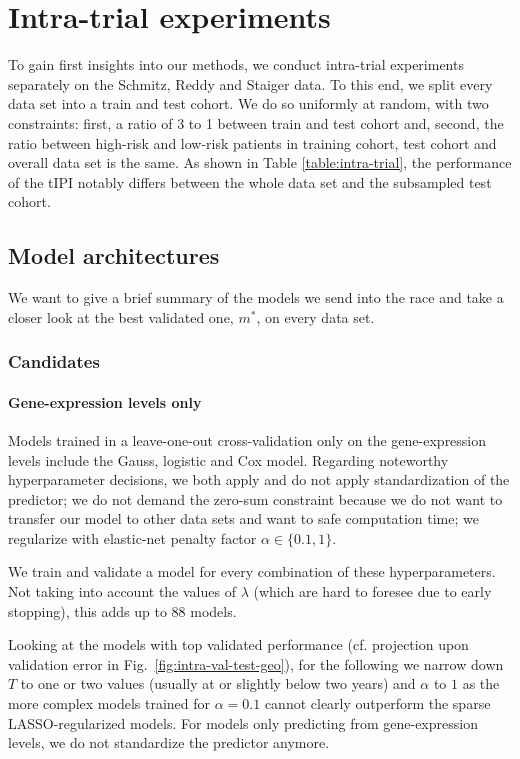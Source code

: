 \section{Intra-trial experiments}\label{sec:intra-trial}

To gain first insights into our methods, we conduct intra-trial experiments separately on the 
Schmitz, Reddy and Staiger data. To this end, we split every data set into a train and test 
cohort. We do so uniformly at random, with two constraints: first, a ratio of 3 to 1 between train 
and test cohort and, second, the ratio between high-risk and low-risk patients in training cohort, 
test cohort and overall data set is the same. As shown in Table \ref{table:intra-trial}, the 
performance of the tIPI notably differs between the whole data set and the subsampled test cohort. 



\subsection{Model architectures}

We want to give a brief summary of the models we send into the race and take a closer look at the 
best validated one, $m^*$, on every data set.

\subsubsection{Candidates}

\paragraph{Gene-expression levels only}
Models trained in a leave-one-out cross-validation only on the gene-expression levels include the 
Gauss, logistic and Cox model. Regarding noteworthy hyperparameter decisions, we both apply and 
do not apply standardization of the predictor; we do not demand the zero-sum constraint 
because we do not want to transfer our model to other data sets and want to safe computation time;
we regularize with elastic-net penalty factor $\alpha \in \{ \num{0.1}, 1 \}$.

We train and validate a model for every combination of these hyperparameters.
Not taking into account the values of $\lambda$ (which are hard to foresee due to early stopping), 
this adds up to \num{88} models.

Looking at the models with top validated performance (cf. projection upon validation error in Fig.\
\ref{fig:intra-val-test-geo}), for the following we narrow down $T$ to one or 
two values (usually at or slightly below two years) and $\alpha$ to $1$ as the more complex models 
trained for $\alpha = \num{0.1}$ cannot clearly outperform the sparse LASSO-regularized models. For 
models only predicting from gene-expression levels, we do not standardize the predictor anymore.


